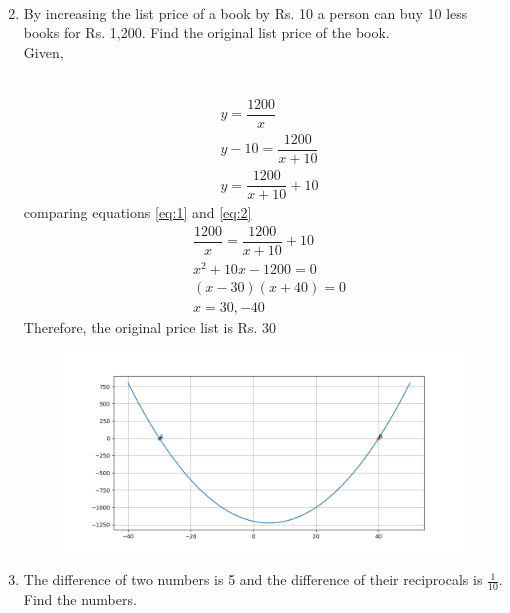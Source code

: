 \documentclass[journal,12pt,twocolumn]{IEEEtran}
\renewcommand\thesection{\arabic{section}}
\begin{document}
\begin{enumerate}[label=\thesection.\arabic*.,ref=\thesection.\theenumi]
\begin{align}
\end{align}
\item  By increasing the list price of a book by Rs. 10 a person can buy 10 less books for Rs. 1,200. Find the original list price of the book.\\
\solution
Given, \\  
\begin{table}[ht]
 \centering
 \caption{}
 \end{table}\\
\begin{align}
&y = \dfrac{1200}{x} \\ \label{eq:1}
&y-10 = \dfrac{1200}{x+10}\\
&y = \dfrac{1200}{x+10} +10  \label{eq:2}
\end{align}
comparing equations \eqref{eq:1} and \eqref{eq:2}
\begin{align}
& \dfrac{1200}{x} =  \dfrac{1200}{x+10} +10\\
&x^2+10x-1200 = 0\\
&(x-30)(x+40)=0\\
&x = 30,-40
\end{align}
Therefore, the original price list is Rs. 30 
  \begin{figure}[H]
	\centering
    \includegraphics[width=\columnwidth]{a_4.png}
    \caption{}
    \label{a_4}
\end{figure}
\item The difference of two numbers is 5 and the difference of their reciprocals is $\displaystyle\frac{1}{10}$. Find the numbers.\\

\end{enumerate}
\end{document}
